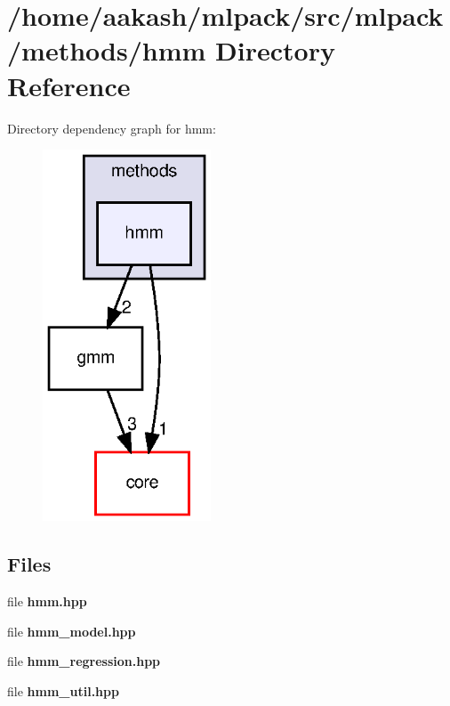 \section{/home/aakash/mlpack/src/mlpack/methods/hmm Directory Reference}
\label{dir_693d33d6e5a445ae210c2bf5cba9783a}
Directory dependency graph for hmm\+:
\nopagebreak
\begin{figure}[H]
\begin{center}
\leavevmode
\includegraphics[width=142pt]{dir_693d33d6e5a445ae210c2bf5cba9783a_dep}
\end{center}
\end{figure}
\subsection*{Files}
\begin{DoxyCompactItemize}
\item 
file \textbf{ hmm.\+hpp}
\item 
file \textbf{ hmm\+\_\+model.\+hpp}
\item 
file \textbf{ hmm\+\_\+regression.\+hpp}
\item 
file \textbf{ hmm\+\_\+util.\+hpp}
\end{DoxyCompactItemize}
